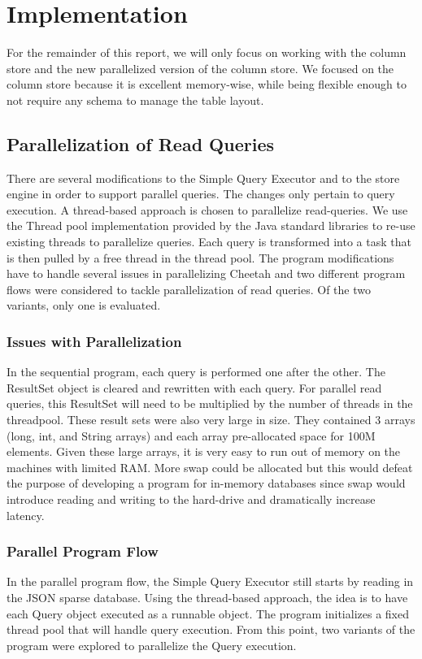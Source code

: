 \documentclass[11pt,journal,compsoc]{IEEEtran}
\begin{document}
\section{Implementation}

For the remainder of this report, we will only focus on working with the column store and the new parallelized version of the column store. We focused on the column store because it is excellent memory-wise, while being flexible enough to not require any schema to manage the table layout. 


\subsection{Parallelization of Read Queries}
There are several modifications to the Simple Query Executor and to the store engine in order to support parallel queries. The changes only pertain to query execution. A thread-based approach is chosen to parallelize read-queries. We use the Thread pool implementation provided by the Java standard libraries to re-use existing threads to parallelize queries. Each query is transformed into a task that is then pulled by a free thread in the thread pool. The program modifications have to handle several issues in parallelizing Cheetah and two different program flows were considered to tackle parallelization of read queries. Of the two variants, only one is evaluated.

\subsubsection{Issues with Parallelization}
In the sequential program, each query is performed one after the other. The ResultSet object is cleared and rewritten with each query. For parallel read queries, this ResultSet will need to be multiplied by the number of threads in the threadpool. These result sets were also very large in size. They contained 3 arrays (long, int, and String arrays) and each array pre-allocated space for 100M elements. Given these large arrays, it is very easy to run out of memory on the machines with limited RAM. More swap could be allocated but this would defeat the purpose of developing a program for in-memory databases since swap would introduce reading and writing to the hard-drive and dramatically increase latency.

\subsubsection{Parallel Program Flow}
In the parallel program flow, the Simple Query Executor still starts by reading in the JSON sparse database. Using the thread-based approach, the idea is to have each Query object executed as a runnable object. The program initializes a fixed thread pool that will handle query execution. From this point, two variants of the program were explored to parallelize the Query execution.
\end{document}
